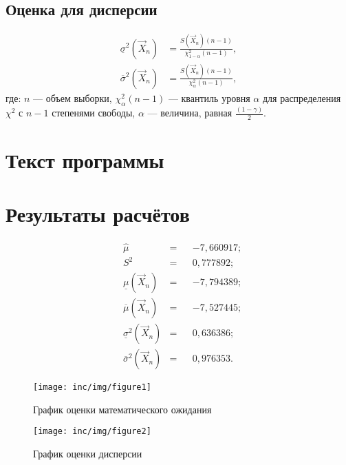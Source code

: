 \documentclass[a4paper,oneside,12pt]{extreport}
\begin{document}
\subsection{Оценка для дисперсии}

\begin{align}
	\underline\sigma^2(\vec X_n) & = \frac{S(\vec X_n)(n-1)}{\chi_{1-\alpha}^2(n-1)},\\
	\overline\sigma^2(\vec X_n)  & = \frac{S(\vec X_n)(n-1)}{\chi_{\alpha}^2(n-1)},
\end{align}
где: $n$ — объем выборки, $\chi_{\alpha}^2(n-1)$ — квантиль уровня $\alpha$ для распределения $\chi^{2}$ с $n-1$ степенями свободы, $\alpha$ — величина, равная $\frac{(1-\gamma)}2$.

\pagebreak
\section{Текст программы}



\pagebreak
\section{Результаты расчётов}

\begin{equation*}
	\begin{aligned}
		&\hat\mu                      &= & &-7,660917; \\
		&S^2                          &= & & 0,777892; \\
		&\underline\mu(\vec X_n)      &= & &-7,794389; \\
		&\overline\mu(\vec X_n)       &= & &-7,527445; \\
		&\underline\sigma^2(\vec X_n) &= & &0,636386; \\
		&\overline\sigma^2(\vec X_n)  &= & &0,976353.
	\end{aligned}
\end{equation*}

\begin{figure}[H]
	\centering
	\texttt{[image: inc/img/figure1]}
	\caption{График оценки математического ожидания}
\end{figure}

\begin{figure}[H]
	\centering
	\texttt{[image: inc/img/figure2]}
	\caption{График оценки дисперсии}
\end{figure}
\end{document}
